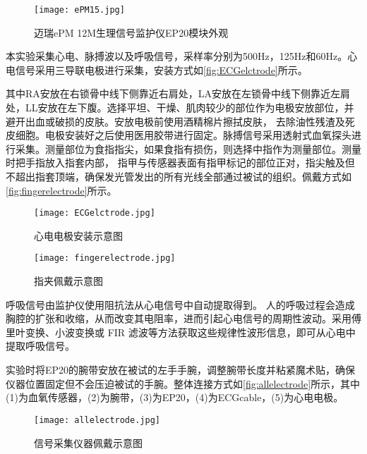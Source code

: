 \begin{figure}[htbp]
    \centering
    \texttt{[image: ePM15.jpg]}
    \caption[迈瑞ePM 12M生理信号监护仪EP20模块外观]{迈瑞ePM 12M生理信号监护仪EP20模块外观}{\label{fig:ePM15}}
\end{figure}

本实验采集心电、脉搏波以及呼吸信号，采样率分别为500Hz，125Hz和60Hz。心电信号采用三导联电极进行采集，安装方式如\autoref{fig:ECGelctrode}所示。

其中RA安放在右锁骨中线下侧靠近右肩处，LA安放在左锁骨中线下侧靠近左肩处，LL安放在左下腹。选择平坦、干燥、肌肉较少的部位作为电极安放部位，并避开出血或破损的皮肤。安放电极前使用酒精棉片擦拭皮肤，
去除油性残渣及死皮细胞。电极安装好之后使用医用胶带进行固定。脉搏信号采用透射式血氧探头进行采集。测量部位为食指指尖，如果食指有损伤，则选择中指作为测量部位。测量时把手指放入指套内部，
指甲与传感器表面有指甲标记的部位正对，指尖触及但不超出指套顶端，确保发光管发出的所有光线全部通过被试的组织。佩戴方式如\autoref{fig:fingerelectrode}所示。

\begin{figure}[htbp]
    \hspace {0.1cm}
	\centering
	\begin{minipage}[l]{0.30\textwidth}
        \centering
		\texttt{[image: ECGelctrode.jpg]}
		\caption[心电电极安装示意图]{心电电极安装示意图}
		\label{fig:ECGelctrode}
	\end{minipage} 
    \hspace{.65in}
	\begin{minipage}[c]{0.4\textwidth}
		\hspace {-1cm}
        \centering
        \vspace{-1.5em}
        \setlength{\abovecaptionskip}{3em}
		\texttt{[image: fingerelectrode.jpg]}
        \caption[指夹佩戴示意图]{指夹佩戴示意图$\qquad$ $\qquad$ $\quad$ }
		\label{fig:fingerelectrode}
	\end{minipage}
\end{figure}

呼吸信号由监护仪使用阻抗法从心电信号中自动提取得到。
人的呼吸过程会造成胸腔的扩张和收缩，从而改变其电阻率，进而引起心电信号的周期性波动。采用傅里叶变换、小波变换或 FIR 滤波等方法获取这些规律性波形信息，即可从心电中提取呼吸信号。

实验时将EP20的腕带安放在被试的左手手腕，调整腕带长度并粘紧魔术贴，确保仪器位置固定但不会压迫被试的手腕。整体连接方式如\autoref{fig:allelectrode}所示，其中(1)为血氧传感器，(2)为腕带，(3)为EP20，(4)为ECGcable，(5)为心电电极。 
\begin{figure}[htbp]
    \centering
    \vspace{-0.2em}
    \texttt{[image: allelectrode.jpg]}
    \setlength{\abovecaptionskip}{0.2em}
    \caption[信号采集仪器佩戴示意图]{信号采集仪器佩戴示意图}{\label{fig:allelectrode}}
\end{figure}

